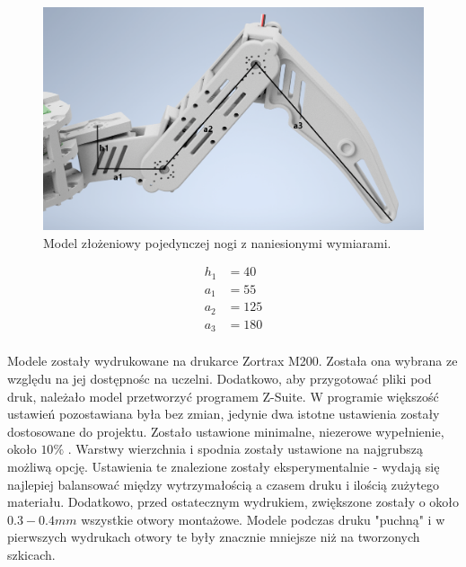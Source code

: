 \begin{figure}[h!]
\includegraphics[width=\textwidth]{img/assembly_leg_lines.png}
\caption{Model złożeniowy pojedynczej nogi z naniesionymi wymiarami.}
\label{img:assembly_leg_lines}
\end{figure}

\begin{equation} \label{eq:physical_params}
\begin{split}
    h_1 &= 40\\
    a_1 &= 55\\
    a_2 &= 125\\
    a_3 &= 180\\
\end{split}
\end{equation}

Modele zostały wydrukowane na drukarce Zortrax M200. Została ona wybrana ze względu na jej dostępnośc na uczelni. Dodatkowo, aby przygotować pliki pod druk, należało model przetworzyć programem Z-Suite. W programie większość ustawień pozostawiana była bez zmian, jedynie dwa istotne ustawienia zostały dostosowane do projektu. Zostało ustawione minimalne, niezerowe wypełnienie, około $10\%$ . Warstwy wierzchnia i spodnia zostały ustawione na najgrubszą możliwą opcję. Ustawienia te znalezione zostały eksperymentalnie - wydają się najlepiej balansować między wytrzymałością a czasem druku i ilością zużytego materiału. Dodatkowo, przed ostatecznym wydrukiem, zwiększone zostały o około $0.3-0.4 mm$ wszystkie otwory montażowe. Modele podczas druku "puchną" i w pierwszych wydrukach otwory te były znacznie mniejsze niż na tworzonych szkicach.\\
